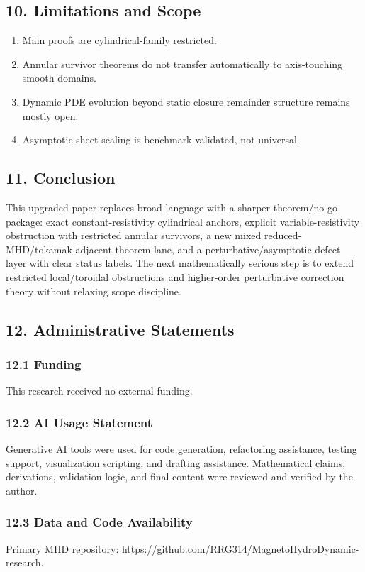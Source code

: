 \documentclass[11pt]{article}
\begin{document}
\subsection*{10. Limitations and Scope}
\begin{enumerate}
\item Main proofs are cylindrical-family restricted.
\item Annular survivor theorems do not transfer automatically to axis-touching smooth domains.
\item Dynamic PDE evolution beyond static closure remainder structure remains mostly open.
\item Asymptotic sheet scaling is benchmark-validated, not universal.
\end{enumerate}

\subsection*{11. Conclusion}
This upgraded paper replaces broad language with a sharper theorem/no-go package: exact constant-resistivity cylindrical anchors, explicit variable-resistivity obstruction with restricted annular survivors, a new mixed reduced-MHD/tokamak-adjacent theorem lane, and a perturbative/asymptotic defect layer with clear status labels. The next mathematically serious step is to extend restricted local/toroidal obstructions and higher-order perturbative correction theory without relaxing scope discipline.


\subsection*{12. Administrative Statements}
\subsubsection*{12.1 Funding}
This research received no external funding.


\subsubsection*{12.2 AI Usage Statement}
Generative AI tools were used for code generation, refactoring assistance, testing support, visualization scripting, and drafting assistance. Mathematical claims, derivations, validation logic, and final content were reviewed and verified by the author.


\subsubsection*{12.3 Data and Code Availability}
Primary MHD repository: https://github.com/RRG314/MagnetoHydroDynamic-research.
\end{document}

